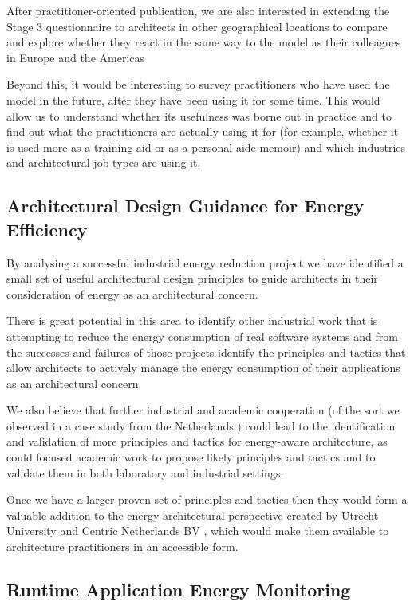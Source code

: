 After practitioner-oriented publication, we are also interested in extending the Stage 3 questionnaire to architects in other geographical locations to compare and explore whether they react in the same way to the model as their colleagues in Europe and the Americas

Beyond this, it would be interesting to survey practitioners who have used the model in the future, after they have been using it for some time.  This would allow us to understand whether its usefulness was borne out in practice and to find out what the practitioners are actually using it for (for example, whether it is used more as a training aid or as a personal aide memoir) and which industries and architectural job types are using it.

\subsection{Architectural Design Guidance for Energy Efficiency}

By analysing a successful industrial energy reduction project we have identified a small set of useful architectural design principles to guide architects in their consideration of energy as an architectural concern.  

There is great potential in this area to identify other industrial work that is attempting to reduce the energy consumption of real software systems and from the successes and failures of those projects identify the principles and tactics that allow architects to actively manage the energy consumption of their applications as an architectural concern.  

We also believe that further industrial and academic cooperation (of the sort we observed in a case study from the Netherlands \cite{jagroep2016-comparingreleases}) could lead to the identification and validation of more principles and tactics for energy-aware architecture, as could focused academic work to propose likely principles and tactics and to validate them in both laboratory and industrial settings.

Once we have a larger proven set of principles and tactics then they would form a valuable addition to the energy architectural perspective created by Utrecht University and Centric Netherlands BV \cite{jagroep2017-energyperspective}, which would make them available to architecture practitioners in an accessible form.

\subsection{Runtime Application Energy Monitoring}

